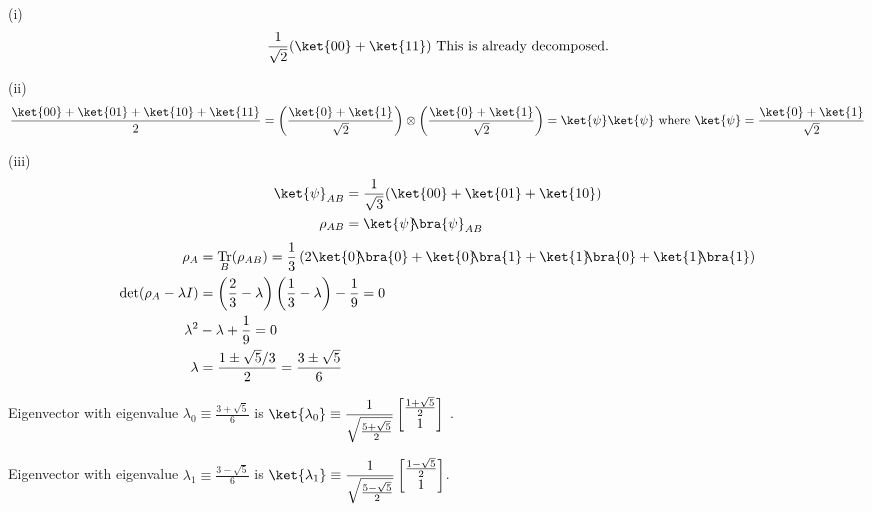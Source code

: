 \documentclass[10pt]{book}
\DeclareMathOperator{\Tr}{Tr}
\newcommand{\kb}[1]{\ket{#1}\hspace{-1mm} \bra{#1}} %
\newcommand{\kbt}[2]{\ket{#1}\hspace{-1mm} \bra{#2}} %
\begin{document}
	
	
	
	(i)
	\begin{equation}
\begin{aligned}
		\frac{1}{\sqrt{2}} (\ket{00} + \ket{11}) \text{ This is already decomposed.}
	\end{aligned}
\end{equation}
	
	
	(ii)
	\begin{equation}
\begin{aligned}
		\frac{\ket{00}+ \ket{01} + \ket{10} + \ket{11}}{2} = \left( \frac{\ket{0} + \ket{1}}{\sqrt{2}}  \right) \otimes \left( \frac{\ket{0} + \ket{1}}{\sqrt{2}}  \right) = \ket{\psi} \ket{\psi} \text{ where } \ket{\psi} = \frac{\ket{0} + \ket{1}}{\sqrt{2}}
	\end{aligned}
\end{equation}
	
	
	
	(iii)
	\begin{equation}
\begin{aligned}
		\ket{\psi}_{AB} &= \frac{1}{\sqrt{3}} (\ket{00} + \ket{01} + \ket{10})\\
		\rho_{AB} &= \kb{\psi}_{AB}
	\end{aligned}
\end{equation}
	\begin{equation}
\begin{aligned}
		\rho_A &= \Tr_B (\rho_{AB}) = \frac{1}{3} \left( 2\kb{0} + \kbt{0}{1} + \kbt{1}{0} + \kb{1} \right)\\
		\det (\rho_A - \lambda I) &= \left( \frac{2}{3} - \lambda \right) \left( \frac{1}{3} - \lambda \right) - \frac{1}{9} = 0\\
		\lambda^2 &- \lambda + \frac{1}{9} = 0\\
		\lambda &= \frac{1 \pm \sqrt{5} / 3}{2} = \frac{3 \pm \sqrt{5}}{6}
	\end{aligned}
\end{equation}
	
	
	
	Eigenvector with eigenvalue $\displaystyle \lambda_0 \equiv \frac{3 + \sqrt{5}}{6}$ is $\displaystyle \ket{\lambda_0} \equiv \frac{1}{\sqrt{\frac{5 + \sqrt{5}}{2}}} \begin{bmatrix}
		\frac{1 + \sqrt{5}}{2} \\
		1
	\end{bmatrix}$ .
	
	Eigenvector with eigenvalue $\displaystyle \lambda_1 \equiv \frac{3 - \sqrt{5}}{6}$ is $\displaystyle \ket{\lambda_1} \equiv \frac{1}{\sqrt{\frac{5 - \sqrt{5}}{2}}} \begin{bmatrix}
		\frac{1 - \sqrt{5}}{2} \\
		1
	\end{bmatrix} $.
	
\end{document}
